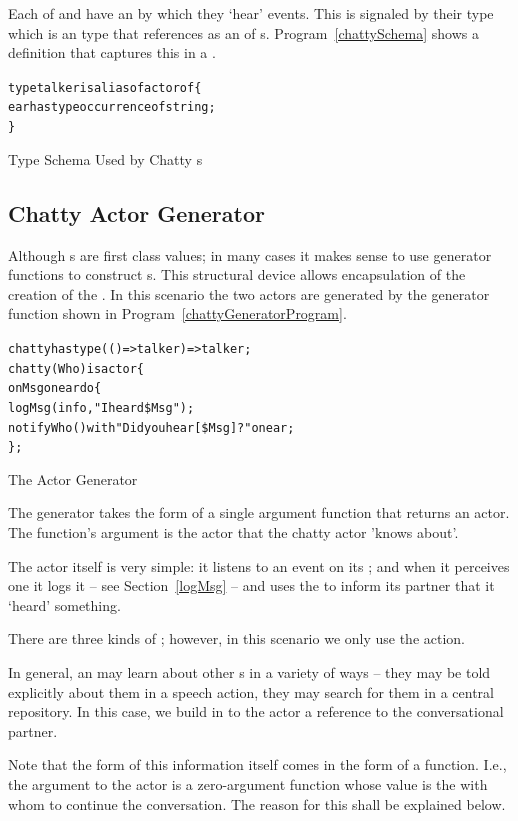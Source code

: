 Each of  and  have an  by which they `hear' events. This is signaled by their type which is an  type that references  as an  of s. Program~\vref{chattySchema} shows a   definition that captures this in a . 
\begin{program}
\begin{alltt}
type talker is alias of actor of \{
  ear has type occurrence of string;
\}
\end{alltt}
\caption{Type Schema Used by Chatty s}
\label{chattySchema}
\end{program}

\subsection{Chatty Actor Generator}
\label{chattyGenerator}
Although s are first class values; in many cases it makes sense to use generator functions to construct s. This structural device allows encapsulation of the creation of the . In this scenario the two actors are generated by the generator function shown in Program~\vref{chattyGeneratorProgram}.
\begin{program}
\begin{alltt}
chatty has type (()=>talker)=>talker;
chatty(Who) is actor\{
 on Msg on ear do\{
   logMsg(info,"I heard \$Msg");
   notify Who() with "Did you hear [\$Msg]?" on ear;
\};
\end{alltt}
\caption{The  Actor Generator}
\label{chattyGeneratorProgram}
\end{program}

The  generator takes the form of a single argument function that returns an actor. The function's argument is the actor that the chatty actor 'knows about'.

The  actor itself is very simple: it listens to an event on its ; and when it perceives one it logs it -- see Section~\vref{logMsg} -- and uses the   to inform its partner that it `heard' something. 

There are three kinds of ; however, in this scenario we only use the  action.

\begin{aside}
In general, an  may learn about other s in a variety of ways -- they may be told explicitly about them in a speech action, they may search for them in a central repository. In this case, we build in to the actor a reference to the conversational partner.
\begin{aside}
Note that the form of this information itself comes in the form of a function. I.e., the argument to the  actor is a zero-argument function whose value is the  with whom to continue the conversation. The reason for this shall be explained below.
\end{aside}
\end{aside}

